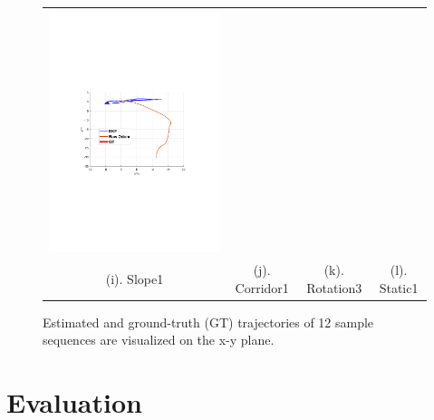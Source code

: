 \documentclass[conference]{IEEEtran}
\begin{document}
\begin{figure}
\begin{center}
\begin{tabular}{cccc}
				\includegraphics[scale=0.26]{fig/static1.pdf}
				
				\\
				(i).  Slope1 & (j).  Corridor1 & (k).  Rotation3 & (l).  Static1\\	
			\end{tabular}
		\end{center}
		\caption{Estimated and ground-truth (GT) trajectories of 12 sample sequences are visualized on the x-y plane. }
		\label{plots}
	\end{figure}



	
\section{Evaluation}
	
\end{document}

